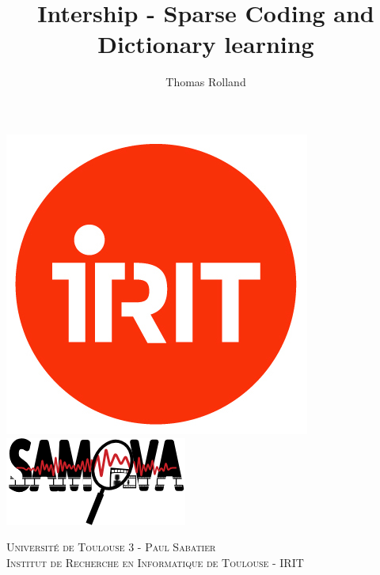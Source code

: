 \documentclass[a4paper,10pt]{article}
\title{Intership - Sparse Coding and Dictionary learning}
\author{Thomas Rolland}
\date{}%
\begin{document}
\begin{titlepage} %
	\newcommand{\HRule}{\rule{\linewidth}{0.5mm}} %
	
	\includegraphics[scale=2]{siteon0.png} %
\hfill
 \includegraphics[scale=2]{SAMOVA.png}

	\center %
	
	
	\textsc{\LARGE Université de Toulouse 3 - Paul Sabatier}\\[1.5cm] %
	
	\textsc{\Large Institut de Recherche en Informatique de Toulouse - IRIT}\\[0.5cm] %
	

\end{titlepage}
\end{document}
